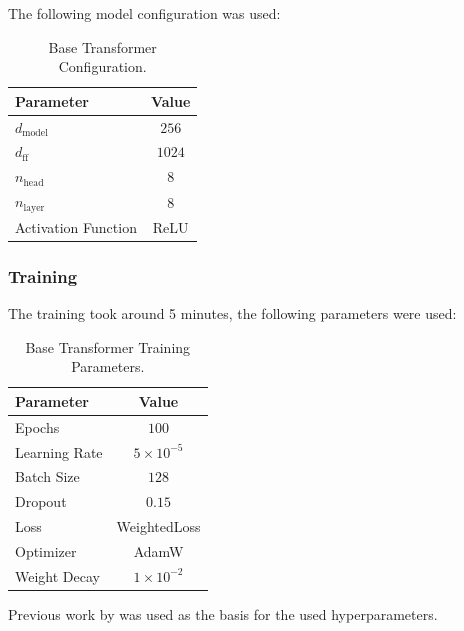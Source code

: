 The following model configuration was used:

\FloatBarrier

\begin{table}[H]
    \centering
    \small
    \renewcommand{\arraystretch}{1.1}

    \begin{tabularx}{0.6\textwidth}{X c}
        \toprule
        \textbf{Parameter} & \textbf{Value} \tabularnewline
        \midrule
        $d_{\mathrm{model}}$ & $256$ \tabularnewline
        $d_{\mathrm{ff}}$    & $1024$ \tabularnewline
        $n_{\mathrm{head}}$  & $8$ \tabularnewline
        $n_{\mathrm{layer}}$ & $8$ \tabularnewline
        Activation Function & ReLU \tabularnewline
        \bottomrule
    \end{tabularx}

    \caption[Base Transformer Configuration]{Base Transformer Configuration.}
    \label{tab:04_base_transformer_configuration}
\end{table}

\FloatBarrier

\subsubsection{Training}

The training took around 5 minutes, the following parameters were used:

\begin{table}[H]
    \centering
    \small
    \renewcommand{\arraystretch}{1.1}

    \begin{tabularx}{0.6\textwidth}{X c}
        \toprule
        \textbf{Parameter} & \textbf{Value} \tabularnewline
        \midrule
        Epochs        & $100$ \tabularnewline
        Learning Rate & $5 \times 10^{-5}$ \tabularnewline
        Batch Size    & $128$ \tabularnewline
        Dropout       & $0.15$ \tabularnewline
        Loss          & WeightedLoss \tabularnewline
        Optimizer     & AdamW \tabularnewline
        Weight Decay  & $1 \times 10^{-2}$ \tabularnewline
        \bottomrule
    \end{tabularx}

    \caption[Base Transformer Training Parameters]{Base Transformer Training Parameters.}
    \label{tab:04_base_transformer_training}
\end{table}

\FloatBarrier

Previous work by \textcite{Hu2022, ECGformer} was used as the basis for the used hyperparameters.

